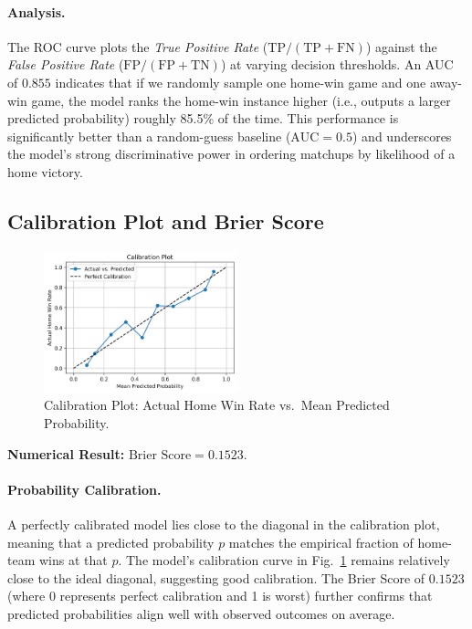 \documentclass[12pt]{article}
\begin{document}
\paragraph{Analysis.} 
The ROC curve plots the \emph{True Positive Rate} (\(\text{TP}/(\text{TP}+\text{FN})\)) against the \emph{False Positive Rate} (\(\text{FP}/(\text{FP}+\text{TN})\)) at varying decision thresholds. An AUC of \(0.855\) indicates that if we randomly sample one home-win game and one away-win game, the model ranks the home-win instance higher (i.e., outputs a larger predicted probability) roughly 85.5\% of the time. This performance is significantly better than a random-guess baseline (\(\text{AUC}=0.5\)) and underscores the model’s strong discriminative power in ordering matchups by likelihood of a home victory.

\subsection{Calibration Plot and Brier Score}
\begin{figure}[H]
\centering
\includegraphics[width=0.5\textwidth]{graph_calibration.png}
\caption{Calibration Plot: Actual Home Win Rate vs.\ Mean Predicted Probability.}
\label{fig:calibration}
\end{figure}

\noindent
\textbf{Numerical Result:} \(\text{Brier Score} = 0.1523.\)

\paragraph{Probability Calibration.}
A perfectly calibrated model lies close to the diagonal in the calibration plot, meaning that a predicted probability \(p\) matches the empirical fraction of home-team wins at that \(p\). The model’s calibration curve in Fig.~\ref{fig:calibration} remains relatively close to the ideal diagonal, suggesting good calibration. The Brier Score of \(0.1523\) (where 0 represents perfect calibration and 1 is worst) further confirms that predicted probabilities align well with observed outcomes on average. 
\end{document}
